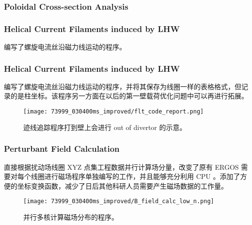 

\begin{frame}
  \frametitle{Poloidal Cross-section Analysis}
  \begin{figure}[t]
      \centering
      \hfill
  \end{figure}
\end{frame}



\begin{frame}
  \frametitle{Helical Current Filaments induced by LHW}
编写了螺旋电流丝沿磁力线运动的程序。
\begin{figure}[t]
  \centering
  \hfill
\end{figure}
\end{frame}

\begin{frame}
  \frametitle{Helical Current Filaments induced by LHW}
编写了螺旋电流丝沿磁力线运动的程序，并将其保存为线圈一样的表格格式，但记录的是柱坐标。该程序另一方面在以后的第一壁载荷优化问题中可以再进行拓展。
\begin{figure}[htbp]
  \centering%
      \texttt{[image: 73999\_030400ms\_improved/flt\_code\_report.png]}
      \caption{迹线追踪程序打到壁上会进行 out of divertor 的示意。}
\end{figure}
\end{frame}


\begin{frame}
  \frametitle{Perturbant Field Calculation }
  直接根据扰动场线圈 XYZ 点集工程数据并行计算场分量，改变了原有 ERGOS 需要对每个线圈进行磁场程序单独编写的工作，并且能够充分利用 CPU 。添加了方便的坐标变换函数，减少了日后其他科研人员需要产生磁场数据的工作量。

  \begin{figure}[htbp]
    \centering%
        \texttt{[image: 73999\_030400ms\_improved/B\_field\_calc\_low\_n.png]}
        \caption{并行多核计算磁场分布的程序。}
  \end{figure}
\end{frame}

